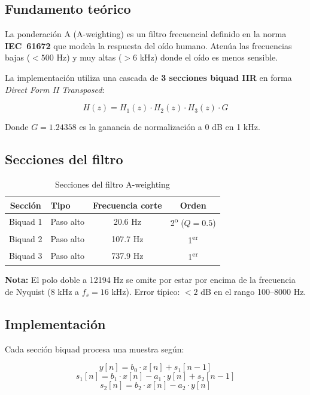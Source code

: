 \documentclass[12pt,a4paper]{report}
\begin{document}
\subsection{Fundamento te\'orico}

La ponderaci\'on A (A-weighting) es un filtro frecuencial definido en la norma \textbf{IEC~61672} que modela la respuesta del o\'ido humano. Aten\'ua las frecuencias bajas ($< 500$ Hz) y muy altas ($> 6$ kHz) donde el o\'ido es menos sensible.

La implementaci\'on utiliza una cascada de \textbf{3 secciones biquad IIR} en forma \textit{Direct Form II Transposed}:

\begin{equation}
H(z) = H_1(z) \cdot H_2(z) \cdot H_3(z) \cdot G
\end{equation}

Donde $G = 1.24358$ es la ganancia de normalizaci\'on a 0 dB en 1 kHz.

\subsection{Secciones del filtro}

\begin{table}[H]
\centering
\begin{tabular}{clcc}
\toprule
\textbf{Secci\'on} & \textbf{Tipo} & \textbf{Frecuencia corte} & \textbf{Orden} \\
\midrule
Biquad 1 & Paso alto & 20.6 Hz & 2\textsuperscript{o} ($Q = 0.5$) \\
Biquad 2 & Paso alto & 107.7 Hz & 1\textsuperscript{er} \\
Biquad 3 & Paso alto & 737.9 Hz & 1\textsuperscript{er} \\
\bottomrule
\end{tabular}
\caption{Secciones del filtro A-weighting}
\end{table}

\textbf{Nota:} El polo doble a 12194 Hz se omite por estar por encima de la frecuencia de Nyquist (8 kHz a $f_s = 16$ kHz). Error t\'ipico: $< 2$ dB en el rango 100--8000 Hz.

\subsection{Implementaci\'on}

Cada secci\'on biquad procesa una muestra seg\'un:

\begin{equation}
y[n] = b_0 \cdot x[n] + s_1[n-1]
\end{equation}
\begin{equation}
s_1[n] = b_1 \cdot x[n] - a_1 \cdot y[n] + s_2[n-1]
\end{equation}
\begin{equation}
s_2[n] = b_2 \cdot x[n] - a_2 \cdot y[n]
\end{equation}
\end{document}
